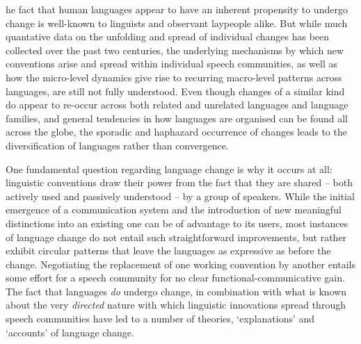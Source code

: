 


he fact that human languages appear to have an inherent propensity to undergo change is well-known to linguists and observant laypeople alike.
But while much quantative data on the unfolding and spread of individual changes has been collected over the past two centuries, the underlying mechanisms by which new conventions arise and spread within individual speech communities, as well as how the micro-level dynamics give rise to recurring macro-level patterns across languages, are still not fully understood.
Even though changes of a similar kind do appear to re-occur across both related and unrelated languages and language families, and general tendencies in how languages are organised can be found all across the globe, the sporadic and haphazard occurrence of changes leads to the diversification of languages rather than convergence.

One fundamental question regarding language change is why it occurs at all: linguistic conventions draw their power from the fact that they are shared -- both actively used and passively understood -- by a group of speakers. While the initial emergence of a communication system and the introduction of new meaningful distinctions into an existing one can be of advantage to its users, most instances of language change do not entail such straightforward improvements, 
but rather exhibit circular patterns that leave the languages as expressive as before the change. Negotiating the replacement of one working convention by another entails some effort for a speech community for no clear functional-communicative gain.
The fact that languages \emph{do} undergo change, in combination with what is known about the very \emph{directed} nature with which linguistic innovations spread through speech communities have led to a number of theories, `explanations' and `accounts' of language change.

